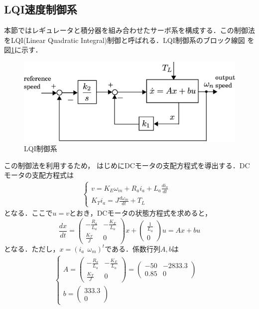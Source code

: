 \documentclass[a4paper,12pt]{jarticle}
\begin{document}
\subsection{LQI速度制御系}
本節ではレギュレータと積分器を組み合わせたサーボ系を構成する．この制御法
をLQI(Linear Quadratic Integral)制御と呼ばれる．LQI制御系のブロック線図
を図\ref{fig:LQI_model}に示す．
%
\begin{figure}[htbp]
 \begin{center}
  \includegraphics[width = 150mm]{fig/LQI_model.eps}
 \end{center}
 \caption{LQI制御系}
 \label{fig:LQI_model}
\end{figure}
%
この制御法を利用するため，
はじめにDCモータの支配方程式を導出する．DCモータの支配方程式は
%
\begin{eqnarray}
 \begin{cases}
  v = K_{E}\omega_m + R_{a}i_{a} + L_{a} \frac{di_a}{dt} & \\
  K_{T}i_a = J \frac{d\omega_m}{dt} + T_{L}
 \end{cases}
\end{eqnarray}
%
となる．ここで$u=v$とおき，DCモータの状態方程式を求めると，
\begin{equation}
 \frac{dx}{dt} =
  \begin{pmatrix}
   - \frac{R_a}{L_a} & -\frac{K_E}{L_a} \\
   \frac{K_T}{J} & 0
  \end{pmatrix}
  x +
\begin{pmatrix}
 \frac{1}{L_a} \\
 0
\end{pmatrix}
u = Ax + bu
\end{equation}
となる．ただし，$x=(i_a \ \ \omega_m)^t$である．係数行列$A,b$は
%
\begin{eqnarray}
 \begin{cases}
A=
  \begin{pmatrix}
   - \frac{R_a}{L_a} & -\frac{K_E}{L_a} \\
   \frac{K_T}{J} & 0
  \end{pmatrix}
  =
  \begin{pmatrix}
   -50  & -2833.3 \\
   0.85 & 0
  \end{pmatrix}
  & \\
  b =
  \begin{pmatrix}
   333.3 \\
   0
  \end{pmatrix}
 \end{cases}
\end{eqnarray}
\end{document}
